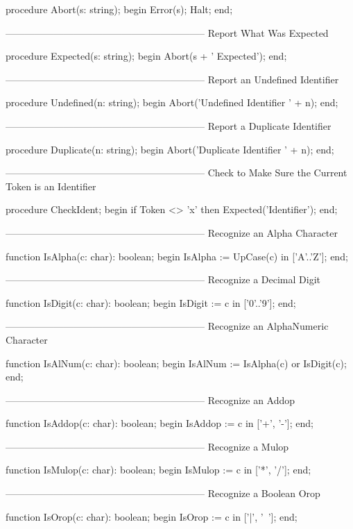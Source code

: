 \documentclass[float=false, crop=false]{standalone}
\begin{document}
\begin{code}
procedure Abort(s: string);
begin
   Error(s);
   Halt;
end;


{--------------------------------------------------------------}
{ Report What Was Expected }

procedure Expected(s: string);
begin
   Abort(s + ' Expected');
end;

{--------------------------------------------------------------}
{ Report an Undefined Identifier }

procedure Undefined(n: string);
begin
   Abort('Undefined Identifier ' + n);
end;


{--------------------------------------------------------------}
{ Report a Duplicate Identifier }

procedure Duplicate(n: string);
begin
   Abort('Duplicate Identifier ' + n);
end;


{--------------------------------------------------------------}
{ Check to Make Sure the Current Token is an Identifier }

procedure CheckIdent;
begin
   if Token <> 'x' then Expected('Identifier');
end;


{--------------------------------------------------------------}
{ Recognize an Alpha Character }

function IsAlpha(c: char): boolean;
begin
   IsAlpha := UpCase(c) in ['A'..'Z'];
end;


{--------------------------------------------------------------}
{ Recognize a Decimal Digit }

function IsDigit(c: char): boolean;
begin
   IsDigit := c in ['0'..'9'];
end;


{--------------------------------------------------------------}
{ Recognize an AlphaNumeric Character }

function IsAlNum(c: char): boolean;
begin
   IsAlNum := IsAlpha(c) or IsDigit(c);
end;


{--------------------------------------------------------------}
{ Recognize an Addop }

function IsAddop(c: char): boolean;
begin
   IsAddop := c in ['+', '-'];
end;


{--------------------------------------------------------------}
{ Recognize a Mulop }

function IsMulop(c: char): boolean;
begin
   IsMulop := c in ['*', '/'];
end;


{--------------------------------------------------------------}
{ Recognize a Boolean Orop }

function IsOrop(c: char): boolean;
begin
   IsOrop := c in ['|', '~'];
end;



\end{code}
\end{document}
